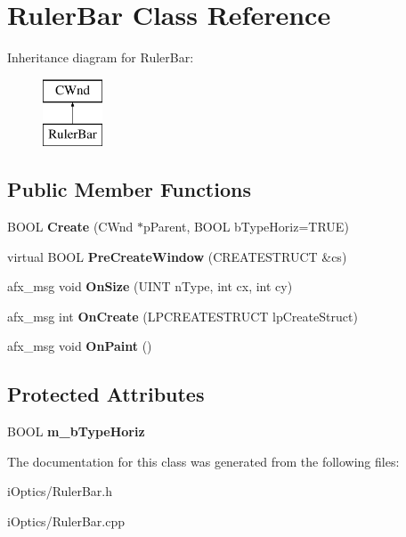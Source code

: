 \hypertarget{class_ruler_bar}{}\section{Ruler\+Bar Class Reference}
\label{class_ruler_bar}
Inheritance diagram for Ruler\+Bar\+:\begin{figure}[H]
\begin{center}
\leavevmode
\includegraphics[height=2.000000cm]{class_ruler_bar}
\end{center}
\end{figure}
\subsection*{Public Member Functions}
\begin{DoxyCompactItemize}
\item 
\mbox{\label{class_ruler_bar_ab7e5d9b49483974bfdf2b31f6312cbe5}} 
B\+O\+OL {\bfseries Create} (C\+Wnd $\ast$p\+Parent, B\+O\+OL b\+Type\+Horiz=T\+R\+UE)
\item 
\mbox{\label{class_ruler_bar_adad01ca5e5ae6d994ede8d5cddd0f2ce}} 
virtual B\+O\+OL {\bfseries Pre\+Create\+Window} (C\+R\+E\+A\+T\+E\+S\+T\+R\+U\+CT \&cs)
\item 
\mbox{\label{class_ruler_bar_a6c403871b29483631af98fa4602fdfee}} 
afx\+\_\+msg void {\bfseries On\+Size} (U\+I\+NT n\+Type, int cx, int cy)
\item 
\mbox{\label{class_ruler_bar_a09b55d38328a3cde6241aaba2d644809}} 
afx\+\_\+msg int {\bfseries On\+Create} (L\+P\+C\+R\+E\+A\+T\+E\+S\+T\+R\+U\+CT lp\+Create\+Struct)
\item 
\mbox{\label{class_ruler_bar_a24651900a15f82994bdb76198ccacf62}} 
afx\+\_\+msg void {\bfseries On\+Paint} ()
\end{DoxyCompactItemize}
\subsection*{Protected Attributes}
\begin{DoxyCompactItemize}
\item 
\mbox{\label{class_ruler_bar_a41a7bf4f9af7375fb6304f7cdb69d2ed}} 
B\+O\+OL {\bfseries m\+\_\+b\+Type\+Horiz}
\end{DoxyCompactItemize}


The documentation for this class was generated from the following files\+:\begin{DoxyCompactItemize}
\item 
i\+Optics/Ruler\+Bar.\+h\item 
i\+Optics/Ruler\+Bar.\+cpp\end{DoxyCompactItemize}
